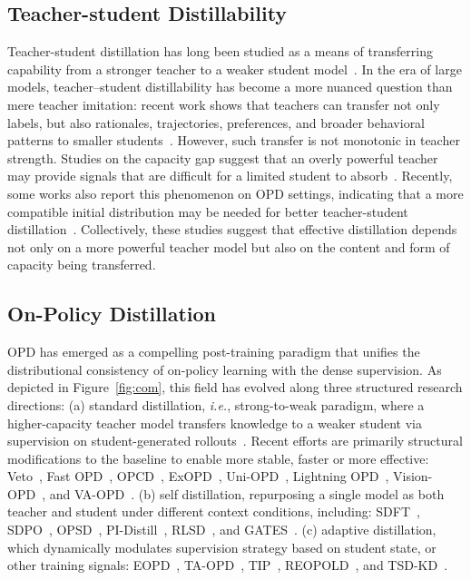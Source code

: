 \documentclass{llmxive}
\begin{document}
\subsection{Teacher-student Distillability}
Teacher-student distillation has long been studied as a means of transferring capability from a stronger teacher to a weaker student model~\citep{kim2016sequence,sanh2019distilbert,yu2026latent}. In the era of large models, teacher–student distillability has become a more nuanced question than mere teacher imitation: recent work shows that teachers can transfer not only labels, but also rationales, trajectories, preferences, and broader behavioral patterns to smaller students~\citep{hsieh2023distilling,gu2024minillm,agarwal2024policy}. However, such transfer is not monotonic in teacher strength. Studies on the capacity gap suggest that an overly powerful teacher may provide signals that are difficult for a limited student to absorb~\citep{busbridge2025distillation,li2025small,xu2025speculative}. 
Recently, some works also report this phenomenon on OPD settings, indicating that a more compatible initial distribution may be needed for better teacher-student distillation~\citep{li2026rethinking,fu2026revisiting,ko2026scaling,agarwal2024policy}.
Collectively, these studies suggest that effective distillation depends not only on a more powerful teacher model but also on the  content and form of capacity being transferred.





\subsection{On-Policy Distillation}
OPD has emerged as a compelling post-training paradigm that unifies the distributional consistency of on-policy learning with the dense supervision. As depicted in Figure~\ref{fig:com}, this field has evolved along three structured research directions: 
(a) standard distillation, \textit{i.e.}, strong-to-weak paradigm, where a higher-capacity teacher model transfers knowledge to a weaker student via supervision on student-generated rollouts~\citep{agarwal2024policy,ko2025distillm,thinking2025opd}. Recent efforts are primarily  structural modifications to the baseline to enable more stable, faster or more effective: Veto~\citep{jang2026stable}, Fast OPD~\citep{zhang2026fast}, OPCD~\citep{ye2026policy}, ExOPD~\citep{yang2026learning}, Uni-OPD~\citep{hou2026uni}, Lightning OPD~\citep{wu2026lightning}, Vision-OPD~\citep{yuan2026vision}, and VA-OPD~\citep{liu2026visual}. 
(b) self distillation, repurposing a single model as both teacher and student under different context conditions, including: SDFT~\citep{shenfeld2026self}, SDPO~\citep{hubotter2026reinforcement}, OPSD~\citep{zhao2026self}, PI-Distill~\citep{penaloza2026privileged}, RLSD~\citep{yang2026self}, and GATES~\citep{stein2026gates}.
(c) adaptive distillation, which dynamically modulates supervision strategy based on student state, or other training signals: EOPD~\citep{jin2026entropy}, TA-OPD~\citep{wang2026not}, TIP~\citep{xu2026tip}, REOPOLD~\citep{ko2026scaling}, and TSD-KD~\citep{kim2026explain}.
\end{document}
